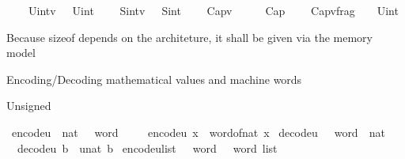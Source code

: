 \begin{isabellebody}
\ \ \ {\isacharbar}{\kern0pt}\ Uint{}{}{\isacharunderscore}{\kern0pt}v\ {\isacharunderscore}{\kern0pt}\ {\isasymRightarrow}\ Uint{}{}\isanewline
\ \ \ {\isacharbar}{\kern0pt}\ Sint{}{}{\isacharunderscore}{\kern0pt}v\ {\isacharunderscore}{\kern0pt}\ {\isasymRightarrow}\ Sint{}{}\isanewline
\ \ \ {\isacharbar}{\kern0pt}\ Cap{\isacharunderscore}{\kern0pt}v\ \ \ \ {\isacharunderscore}{\kern0pt}\ {\isasymRightarrow}\ Cap\isanewline
\ \ \ {\isacharbar}{\kern0pt}\ Cap{\isacharunderscore}{\kern0pt}v{\isacharunderscore}{\kern0pt}frag\ {\isacharunderscore}{\kern0pt}\ {\isacharunderscore}{\kern0pt}\ {\isasymRightarrow}\ Uint{}{\isacharparenright}{\kern0pt}{\isachardoublequoteclose}%
\begin{isamarkuptext}%
Because sizeof depends on the architeture, it shall be given via the memory model%
\end{isamarkuptext}\isamarkuptrue%
%
\begin{isamarkuptext}%
Encoding/Decoding mathematical values and machine words%
\end{isamarkuptext}\isamarkuptrue%
%
\begin{isamarkuptext}%
Unsigned%
\end{isamarkuptext}\isamarkuptrue%
\isamarkupfalse%
\ encode{\isacharunderscore}{\kern0pt}u{}\ {\isacharcolon}{\kern0pt}{\isacharcolon}{\kern0pt}\ {\isachardoublequoteopen}nat\ {\isasymRightarrow}\ {}\ word{\isachardoublequoteclose}\isanewline
\ \ \isanewline
\ \ {\isachardoublequoteopen}encode{\isacharunderscore}{\kern0pt}u{}\ x\ {\isasymequiv}\ word{\isacharunderscore}{\kern0pt}of{\isacharunderscore}{\kern0pt}nat\ x{\isachardoublequoteclose}\isanewline
\isanewline
{}\isamarkupfalse%
\ decode{\isacharunderscore}{\kern0pt}u{}\ {\isacharcolon}{\kern0pt}{\isacharcolon}{\kern0pt}\ {\isachardoublequoteopen}{}\ word\ {\isasymRightarrow}\ nat{\isachardoublequoteclose}\isanewline
\ \ \isanewline
\ \ {\isachardoublequoteopen}decode{\isacharunderscore}{\kern0pt}u{}\ b\ {\isasymequiv}\ unat\ b{\isachardoublequoteclose}\isanewline
\isanewline
{}\isamarkupfalse%
\ encode{\isacharunderscore}{\kern0pt}u{}{\isacharunderscore}{\kern0pt}list\ {\isacharcolon}{\kern0pt}{\isacharcolon}{\kern0pt}\ {\isachardoublequoteopen}{}\ word\ {\isasymRightarrow}\ {}\ word\ list{\isachardoublequoteclose}\isanewline

\end{isabellebody}
